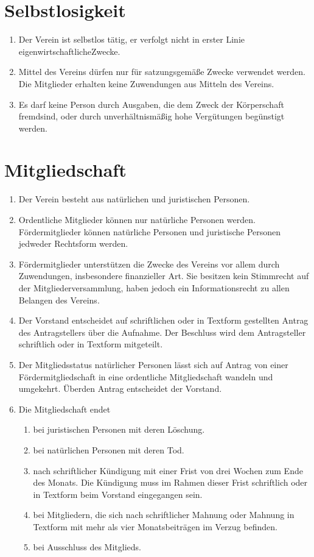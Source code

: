 \documentclass[a4paper, 12pt]{scrartcl}
\begin{document}
\section{Selbstlosigkeit}

\begin{enumerate}
  \item Der Verein ist selbstlos tätig, er verfolgt nicht in erster Linie eigenwirtschaftlicheZwecke.
  \item Mittel des Vereins dürfen nur für satzungsgemäße Zwecke verwendet werden. Die Mitglieder erhalten keine Zuwendungen aus Mitteln des Vereins.
  \item Es darf keine Person durch Ausgaben, die dem Zweck der Körperschaft fremdsind, oder durch unverhältnismäßig hohe Vergütungen begünstigt werden.
\end{enumerate}

\section{Mitgliedschaft}
\begin{enumerate}
  \item Der Verein besteht aus natürlichen und juristischen Personen.
  \item Ordentliche Mitglieder können nur natürliche Personen werden. Fördermitglieder können natürliche Personen und juristische Personen jedweder Rechtsform werden.
  \item Fördermitglieder unterstützen die Zwecke des Vereins vor allem durch Zuwendungen, insbesondere finanzieller Art. Sie besitzen kein Stimmrecht auf der Mitgliederversammlung, haben jedoch ein Informationsrecht zu allen Belangen des Vereins.
  \item Der Vorstand entscheidet auf schriftlichen oder in Textform gestellten Antrag des Antragstellers über die Aufnahme. Der Beschluss wird dem Antragsteller schriftlich oder in Textform mitgeteilt.
  \item Der Mitgliedsstatus natürlicher Personen lässt sich auf Antrag von einer Fördermitgliedschaft in eine ordentliche Mitgliedschaft wandeln und umgekehrt. Überden Antrag entscheidet der Vorstand.
  \item Die Mitgliedschaft endet
  \begin{enumerate}
    \item bei juristischen Personen mit deren Löschung.
    \item bei natürlichen Personen mit deren Tod.
    \item nach schriftlicher Kündigung mit einer Frist von drei Wochen zum Ende des Monats. Die Kündigung muss im Rahmen dieser Frist schriftlich oder in Textform beim Vorstand eingegangen sein.
    \item bei Mitgliedern, die sich nach schriftlicher Mahnung oder Mahnung in Textform mit mehr als vier Monatsbeiträgen im Verzug befinden.
    \item bei Ausschluss des Mitglieds.
  \end{enumerate}
\end{enumerate}
\end{document}
